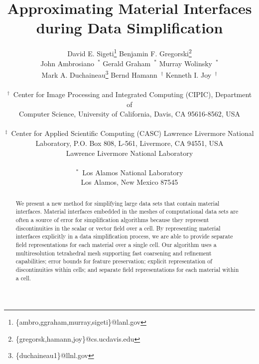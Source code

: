 \documentclass{siggraph}
\begin{document}
\title {Approximating Material Interfaces during Data Simplification}
\author{
  David E. Sigeti\thanks{\{ambro,ggraham,murray,sigeti\}@lanl.gov} \hspace{0.1in} 
  Benjamin F. Gregorski\thanks{\{gregorsk,hamann,joy\}@cs.ucdavis.edu} \hspace{0.1in}\\  
  John Ambrosiano~$^{*}$  
  Gerald Graham~$^{*}$ 
  Murray Wolinsky~$^{*}$\\  
  Mark A. Duchaineau\thanks{\{duchaineau1\}@llnl.gov} \hspace{0.1in} 
  Bernd Hamann~$^{\dag}$  \hspace{0.1in} 
  Kenneth I. Joy~$^{\dag}$  \hspace{0.1in} \\
  \\
  $^{\dag}$~Center for Image Processing and Integrated Computing (CIPIC),
  Department of \\ Computer Science,
  University of California,
  Davis, CA 95616-8562, USA\\
  \\
  $^{\ddag}$~Center for Applied Scientific Computing (CASC) Lawrence Livermore National\\
  Laboratory, P.O. Box 808, L-561, Livermore, CA 94551, USA\\
  Lawrence Livermore National Laboratory\\
  \\
  $^{*}$~Los Alamos National Laboratory\\ 
            Los Alamos, New Mexico 87545\\
}


\date{}
\maketitle


\begin{abstract}
We present a new method for simplifying large data sets that contain
material interfaces.  Material interfaces embedded in the meshes of
computational data sets are often a source of error for simplification
algorithms because they represent discontinuities in the scalar or
vector field over a cell.   By representing material interfaces
explicitly in a data simplification process, we are able to provide
separate field representations for each material over a single
cell.  Our algorithm uses a multiresolution tetrahedral mesh supporting
fast coarsening and refinement capabilities; error bounds for feature
preservation; explicit representation of discontinuities within cells;
and separate field representations for each material within a cell.


\end{abstract}
\end{document}
